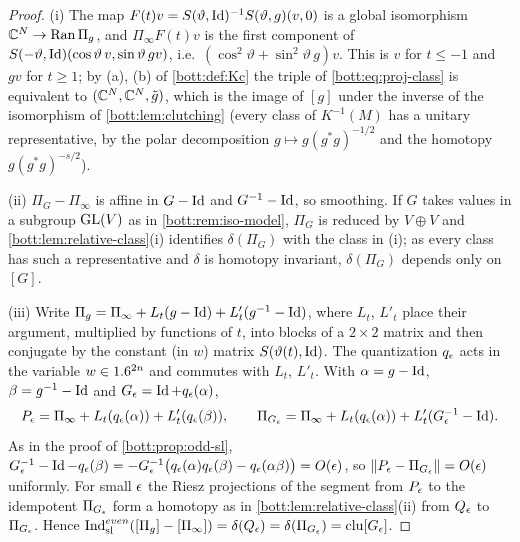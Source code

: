 \begin{proof}
  (i) The map $F(t)v=S(\vartheta,\operatorname{Id})^{-1}S(\vartheta,g)(v,0)$ is a global isomorphism
  $\mathbb{C}^N\to\operatorname{Ran}\Pi_g$, and $\Pi_\infty F(t)v$ is the first component of
  $S(-\vartheta,\operatorname{Id})(\cos\vartheta\,v,\sin\vartheta\,gv)$, i.e.\
  $(\cos^2\vartheta+\sin^2\vartheta\,g)v$. This is $v$ for $t\le-1$ and $gv$ for $t\ge1$; by
  (a), (b) of \cref{bott:def:Kc} the triple of \eqref{bott:eq:proj-class} is equivalent to
  $(\mathbb{C}^N,\mathbb{C}^N,\tilde g)$, which is the image of $[g]$ under the inverse of the
  isomorphism of \cref{bott:lem:clutching} (every class of $K^{-1}(M)$ has a unitary
  representative, by the polar decomposition $g\mapsto g(g^*g)^{-1/2}$ and the homotopy
  $g(g^*g)^{-s/2}$).

  (ii) $\Pi_G-\Pi_\infty$ is affine in $G-\operatorname{Id}$ and $G^{-1}-\operatorname{Id}$, so smoothing. If $G$ takes
  values in a subgroup $\operatorname{GL}(V)$ as in \cref{bott:rem:iso-model}, $\Pi_G$ is reduced by
  $V\oplus V$ and \cref{bott:lem:relative-class}(i) identifies $\delta(\Pi_G)$ with the
  class in (i); as every class has such a representative and $\delta$ is homotopy
  invariant, $\delta(\Pi_G)$ depends only on $[G]$.

  (iii) Write $\Pi_g=\Pi_\infty+L_t(g-\operatorname{Id})+L'_t(g^{-1}-\operatorname{Id})$, where $L_t$, $L'_t$ place their
  argument, multiplied by functions of $t$, into blocks of a $2\times2$ matrix and then
  conjugate by the constant (in $w$) matrix $S(\vartheta(t),\operatorname{Id})$. The quantization $q_\epsilon$
  acts in the variable $w\in1.6^{2n}$ and commutes with $L_t$, $L'_t$. With
  $\alpha=g-\operatorname{Id}$, $\beta=g^{-1}-\operatorname{Id}$ and $G_\epsilon=\operatorname{Id}+q_\epsilon(\alpha)$,
  \begin{equation*}
    P_\epsilon=\Pi_\infty+L_t(q_\epsilon(\alpha))+L'_t(q_\epsilon(\beta)),\qquad
    \Pi_{G_\epsilon}=\Pi_\infty+L_t(q_\epsilon(\alpha))+L'_t(G_\epsilon^{-1}-\operatorname{Id}).
  \end{equation*}
  As in the proof of \cref{bott:prop:odd-sl},
  $G_\epsilon^{-1}-\operatorname{Id}-q_\epsilon(\beta)=-G_\epsilon^{-1}\bigl(q_\epsilon(\alpha)q_\epsilon(\beta)-q_\epsilon(\alpha\beta)\bigr)=O(\epsilon)$,
  so $\lVert P_\epsilon-\Pi_{G_\epsilon}\rVert=O(\epsilon)$ uniformly. For small $\epsilon$ the Riesz projections
  of the segment from $P_\epsilon$ to the idempotent $\Pi_{G_\epsilon}$ form a homotopy as in
  \cref{bott:lem:relative-class}(ii) from $Q_\epsilon$ to $\Pi_{G_\epsilon}$. Hence
  $\operatorname{Ind}^{even}_{\mathrm{sl}}([\Pi_g]-[\Pi_\infty])=\delta(Q_\epsilon)=\delta(\Pi_{G_\epsilon})=\operatorname{clu}[G_\epsilon]$.
\end{proof}

